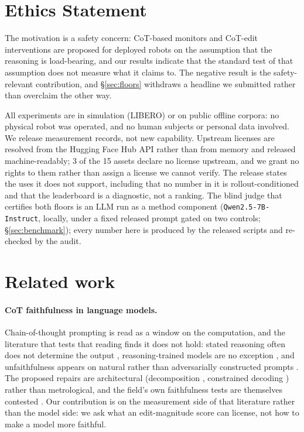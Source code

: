 \documentclass[11pt]{article}
\begin{document}
\section*{Ethics Statement}

The motivation is a safety concern: CoT-based monitors and CoT-edit interventions are proposed for deployed robots on the assumption that the reasoning is load-bearing, and our results indicate that the standard test of that assumption does not measure what it claims to. The negative result is the safety-relevant contribution, and \S\ref{sec:floors} withdraws a headline we submitted rather than overclaim the other way.

All experiments are in simulation (LIBERO) or on public offline corpora: no physical robot was operated, and no human subjects or personal data involved. We release measurement records, not new capability. Upstream licenses are resolved from the Hugging Face Hub API rather than from memory and released machine-readably; 3 of the 15 assets declare no license upstream, and we grant no rights to them rather than assign a license we cannot verify. The release states the uses it does not support, including that no number in it is rollout-conditioned and that the leaderboard is a diagnostic, not a ranking. The blind judge that certifies both floors is an LLM run as a method component (\texttt{Qwen2.5-7B-Instruct}, locally, under a fixed released prompt gated on two controls; \S\ref{sec:benchmark}); every number here is produced by the released scripts and re-checked by the audit.




\appendix

\section{Related work}
\label{sec:related}

\paragraph{CoT faithfulness in language models.} Chain-of-thought prompting \citep{wei2022cot} is read as a window on the computation, and the literature that tests that reading finds it does not hold: stated reasoning often does not determine the output \citep{turpin2023,lanham2023,ye2022unreliability}, reasoning-trained models are no exception \citep{chen2025reasoning}, and unfaithfulness appears on natural rather than adversarially constructed prompts \citep{arcuschin2025}. The proposed repairs are architectural (decomposition \citep{radhakrishnan2023}, constrained decoding \citep{lyu2023faithful}) rather than metrological, and the field's own faithfulness tests are themselves contested \citep{atanasova2023,parcalabescu2024,lyu2024survey}. Our contribution is on the measurement side of that literature rather than the model side: we ask what an edit-magnitude score can license, not how to make a model more faithful.
\end{document}

